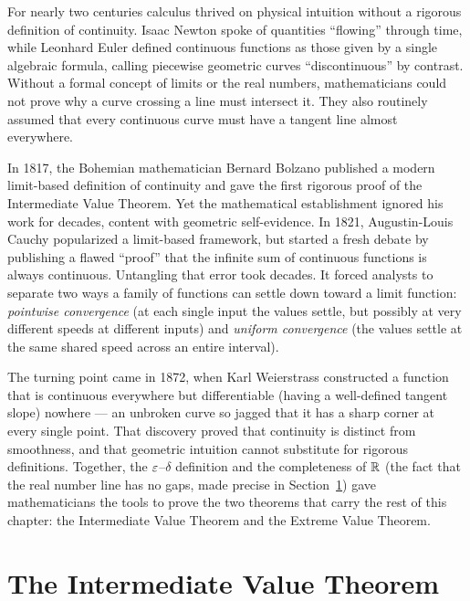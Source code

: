 \begin{historybox}
For nearly two centuries calculus thrived on physical intuition without a rigorous
definition of continuity. Isaac Newton spoke of quantities ``flowing'' through time,
while Leonhard Euler defined continuous functions as those given by a single algebraic
formula, calling piecewise geometric curves ``discontinuous'' by contrast. Without a
formal concept of limits or the real numbers, mathematicians could not prove why a curve
crossing a line must intersect it. They also routinely assumed that every continuous curve
must have a tangent line almost everywhere.

In 1817, the Bohemian mathematician Bernard Bolzano published a modern
limit-based definition of continuity and gave the first rigorous proof of the Intermediate
Value Theorem. Yet the mathematical establishment ignored his work for decades, content
with geometric self-evidence. In 1821, Augustin-Louis Cauchy popularized a limit-based
framework, but started a fresh debate by publishing a flawed ``proof'' that
the infinite sum of continuous functions is always continuous. Untangling that error took
decades. It forced analysts to separate two ways a family of functions can settle down
toward a limit function: \emph{pointwise convergence} (at each single input the values
settle, but possibly at very different speeds at different inputs) and \emph{uniform
convergence} (the values settle at the same shared speed across an entire interval).

The turning point came in 1872, when Karl Weierstrass constructed a function that
is continuous everywhere but differentiable (having a well-defined tangent slope) nowhere
--- an unbroken curve so jagged that it has a sharp corner at every single point. That
discovery proved that continuity is distinct from smoothness, and
that geometric intuition cannot substitute for rigorous definitions. Together, the $\varepsilon$--$\delta$ definition and the completeness of $\mathbb{R}$ (the fact that the real number line has no gaps, made precise in Section~\ref{ch08:ivt}) gave mathematicians the tools to prove the two theorems that carry the rest of this chapter: the Intermediate Value Theorem and the Extreme Value Theorem.
\end{historybox}

\section{The Intermediate Value Theorem}
\label{ch08:ivt}


